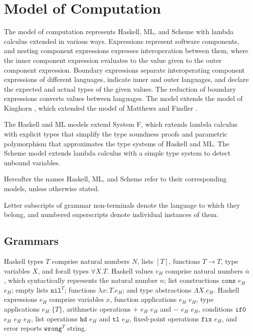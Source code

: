 \chapter{Model of Computation}

The model of computation represents Haskell, ML, and Scheme with lambda calculus extended in various ways.  Expressions represent software components, and nesting component expressions expresses interoperation between them, where the inner component expression evaluates to the value given to the outer component expression.  Boundary expressions separate interoperating component expressions of different languages, indicate inner and outer languages, and declare the expected and actual types of the given values.  The reduction of boundary expressions converts values between languages.  The model extends the model of Kinghorn \cite{kinghorn07}, which extended the model of Matthews and Findler \cite{matthews07}.

The Haskell and ML models extend System F, which extends lambda calculus with explicit types that simplify the type soundness proofs and parametric polymorphism that approximates the type systems of Haskell and ML.  The Scheme model extends lambda calculus with a simple type system to detect unbound variables.

Hereafter the names Haskell, ML, and Scheme refer to their corresponding models, unless otherwise stated.

Letter subscripts of grammar non-terminals denote the language to which they belong, and numbered superscripts denote individual instances of them.

\section{Grammars}

Haskell types $T$ comprise natural numbers $N$, lists $[T]$, functions $T\rightarrow T$, type variables $X$, and forall types $\forall X.T$.  Haskell values $v_{H}$ comprise natural numbers $\overline{n}$, which syntactically represents the natural number $n$; list constructions $\mathtt{cons}$ $e_{H}$ $e_{H}$; empty lists $\mathtt{nil}^{T}$; functions $\lambda x:T.e_{H}$; and type abstractions $\Lambda X.e_{H}$.  Haskell expressions $e_{H}$ comprise variables $x$, function applications $e_{H}$ $e_{H}$, type applications $e_{H}$ $\lbrace T\rbrace$, arithmetic operations $+$ $e_{H}$ $e_{H}$ and $-$ $e_{H}$ $e_{H}$, conditions $\mathtt{if0}$ $e_{H}$ $e_{H}$ $e_{H}$, list operations $\mathtt{hd}$ $e_{H}$ and $\mathtt{tl}$ $e_{H}$, fixed-point operations $\mathtt{fix}$ $e_{H}$, and error reports $\mathtt{wrong}^{T}$ string.

